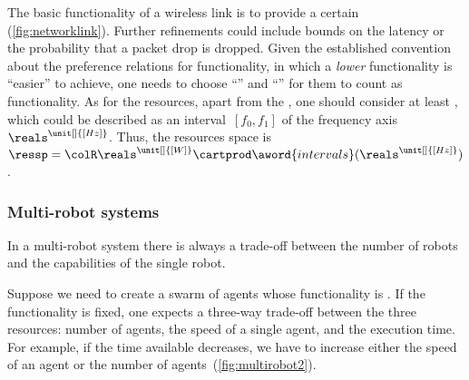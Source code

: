 \begin{example}
    The basic functionality of a wireless link is to provide a certain  (\cref{fig:networklink}).
    Further refinements could include bounds on the latency or the probability that a packet drop is dropped.
    Given the established convention about the preference relations for functionality, in which a \emph{lower} functionality is ``easier''
    to achieve, one needs to choose ``'' and ``'' for them to count as functionality.
    As for the resources, apart from the , one should consider at least , which could be described as an interval~$[f_0,f_1]$ of the frequency axis $\reals^{\unit[]{[Hz]}}$.
    Thus, the resources space is $\ressp=\colR\reals^{\unit[]{[W]}}\cartprod\aword{intervals}(\reals^{\unit[]{[Hz]}})$.
\end{example}
\begin{figure*}[h!]
    \centering
    \caption{ }
    \label{fig:networklink}
\end{figure*}

\subsubsection{Multi-robot systems}

In a multi-robot system there is always a trade-off between the number of robots and the capabilities of the single robot.
\begin{example}
    Suppose we need to create a swarm of agents whose functionality is
    .
    If the functionality is fixed, one expects a three-way trade-off between the three resources: number of agents, the speed of a single agent, and the execution time.
    For example, if the time available decreases, we have to increase either the speed of an agent or the number of agents~(\cref{fig:multirobot2}).
\end{example}

\begin{figure}[h!]
    \\
    \caption{}
\end{figure}

